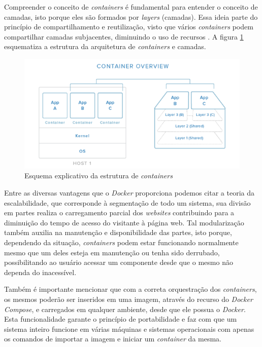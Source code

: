 Compreender o conceito de \textit{containers} é fundamental para entender o conceito de camadas, isto porque eles são formados por \textit{layers} (camadas). Essa ideia parte do princípio de compartilhamento e reutilização, visto que vários \textit{containers} podem compartilhar camadas subjacentes, diminuindo o uso de recursos . A figura \ref{containers} esquematiza a estrutura da arquitetura de \textit{containers} e camadas.

\begin{figure}[htb]
 \centering
 \caption{Esquema explicativo da estrutura de \textit{containers}}
 \includegraphics[scale=0.5]{figuras/containers}
 
 \label{containers}
\end{figure}

Entre as diversas vantagens que o \textit{Docker} proporciona podemos citar a teoria da escalabilidade, que corresponde à segmentação de todo um sistema, sua divisão em partes realiza o carregamento parcial dos \textit{websites} contribuindo para a diminuição do tempo de acesso do visitante à página web. Tal modularização também auxilia na manutenção e disponibilidade das partes, isto porque, dependendo da situação, \textit{containers} podem estar funcionando normalmente mesmo que um deles esteja em manutenção ou tenha sido derrubado, possibilitando ao usuário acessar um componente desde que o mesmo não dependa do inacessível. 

Também é importante mencionar que com a correta orquestração dos \textit{containers}, os mesmos poderão ser inseridos em uma imagem, através do recurso do \textit{Docker Compose}, e carregados em qualquer ambiente, desde que ele possua o \textit{Docker}. Esta funcionalidade garante o princípio de portabilidade e faz com que um sistema inteiro funcione em várias máquinas e sistemas operacionais com apenas os comandos de importar a imagem e iniciar um \textit{container} da mesma.

